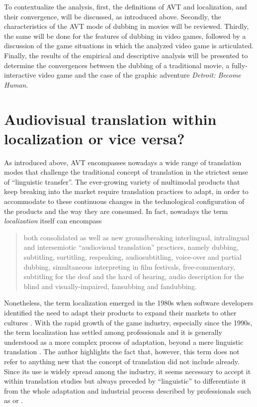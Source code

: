 \documentclass[output=paper]{langsci/langscibook}
\begin{document}
To contextualize the analysis, first, the definitions of AVT and localization, and their convergence, will be discussed, as introduced above. Secondly, the characteristics of the AVT mode of dubbing in movies will be reviewed. Thirdly, the same will be done for the features of dubbing in video games, followed by a discussion of the game situations in which the analyzed video game is articulated. Finally, the results of the empirical and descriptive analysis will be presented to determine the convergences between the dubbing of a traditional movie, a fully-interactive video game \parencites{mejias17}{mejias19} and the case of the graphic adventure \textit{Detroit: Become Human}.

\section{Audiovisual translation within localization or vice versa?}\label{lmc:avt}

As introduced above, AVT encompasses nowadays a wide range of translation modes \parencites[31]{chaume04}[54]{hurtado11} that challenge the traditional concept of translation in the strictest sense of \enquote{linguistic transfer}. The ever-growing variety of multimodal products that keep breaking into the market require translation practices to adapt, in order to accommodate to these continuous changes in the technological configuration of the products and the way they are consumed. In fact, nowadays the term \textit{localization} itself can encompass \blockcquote[84]{chaume18b}{both consolidated as well as new groundbreaking interlingual, intralingual and intersemiotic \enquote{audiovisual translation} practices, namely dubbing, subtitling, surtitling, respeaking, audiosubtitling, voice-over and partial dubbing, simultaneous interpreting in film festivals, free-commentary, subtitling for the deaf and the hard of hearing, audio description for the blind and visually-impaired, fansubbing and fandubbing.}

Nonetheless, the term localization emerged in the 1980s when software developers identified the need to adapt their products to expand their markets to other cultures \parencite[87]{ohaman13}. With the rapid growth of the game industry, especially since the 1990s, the term localization has settled among professionals and it is generally understood as a more complex process of adaptation, beyond a mere linguistic translation \parencite{bernal06}. The author highlights the fact that, however, this term does not refer to anything new that the concept of translation did not include already. Since its use is widely spread among the industry, it seems necessary to accept it within translation studies but always preceded by \enquote{linguistic} to differentiate it from the whole adaptation and industrial process described by professionals such as \textcite{esselink00} or \textcite{maxwell05}.
\end{document}
